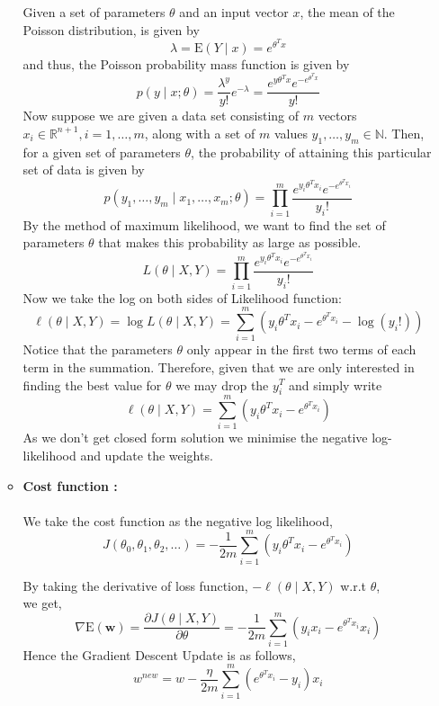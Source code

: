 \documentclass[english,a4paper,12pt]{article}
\begin{document}
\begin{enumerate}
\begin{itemize}
Given a set of parameters $\theta$ and an input vector $x$, the mean of the Poisson distribution, is given by
$$
\lambda=\mathrm{E}(Y \mid x)=e^{\theta^{T} x}
$$
and thus, the Poisson probability mass function is given by
$$
p(y \mid x ; \theta)=\frac{\lambda^{y}}{y !} e^{-\lambda}=\frac{e^{y \theta^{T} x} e^{-e^{\theta^{T} x}}}{y !} 
$$
Now suppose we are given a data set consisting of $m$ vectors $x_{i} \in \mathbb{R}^{n+1}, i=1, \ldots, m$, along with a set of $m$ values $y_{1}, \ldots, y_{m} \in \mathbb{N}$. Then, for a given set of parameters $\theta$, the probability of attaining this particular set of data is given by
$$
p\left(y_{1}, \ldots, y_{m} \mid x_{1}, \ldots, x_{m} ; \theta\right)=\prod_{i=1}^{m} \frac{e^{y_{i} \theta^{T} x_{i}} e^{-e^{\theta^{T} x_{i}}}}{y_{i} !}
$$
By the method of maximum likelihood, we want to find the set of parameters $\theta$ that makes this probability as large as possible. 
$$
L(\theta \mid X, Y)=\prod_{i=1}^{m} \frac{e^{y_{i} \theta^{T} x_{i}} e^{-e^{\theta^{T} x_{i}}}}{y_{i} !}
$$
Now we take the log on both sides of Likelihood function:
$$
\ell(\theta \mid X, Y)=\log L(\theta \mid X, Y)=\sum_{i=1}^{m}\left(y_{i} \theta^{T} x_{i}-e^{\theta^{T} x_{i}}-\log \left(y_{i} !\right)\right)
$$
Notice that the parameters $\theta$ only appear in the first two terms of each term in the summation. Therefore, given that we are only interested in finding the best value for $\theta$ we may drop the $y_{i}^{T}$ and simply write
$$
\ell(\theta \mid X, Y)=\sum_{i=1}^{m}\left(y_{i} \theta^{T} x_{i}-e^{\theta^{T} x_{i}}\right)
$$
As we don't get closed form solution we minimise the negative log-likelihood and update the weights.
\item \textbf{Cost function :}\\\\
We take the cost function as the negative log likelihood,
$$J\left(\theta_{0}, \theta_{1}, \theta_{2}, \ldots\right)=-\frac{1}{2m}\sum_{i=1}^{m}\left(y_{i} \theta^{T} x_{i}-e^{\theta^{T} x_{i}}\right)$$

By taking the derivative of loss function, $-\ell(\theta \mid X, Y)$ w.r.t $\theta$,\\ we get,
$$ \nabla \mathrm{E}(\mathbf{w})=\frac{\partial J(\theta \mid X, Y)}{\partial \theta}=-\frac{1}{2m}\sum_{i=1}^{m}\left(y_{i} x_{i}-e^{\theta^{T} x_{i}} x_{i}\right)$$    
Hence the Gradient Descent Update is as follows,
$$w^{n e w}=w -\frac{\eta}{2m} \sum_{i=1}^{m}\left( e^{\theta^{T} x_{i}}  - y_{i} \right) x_{i}  $$  


\end{itemize}
\end{enumerate}
\end{document}
